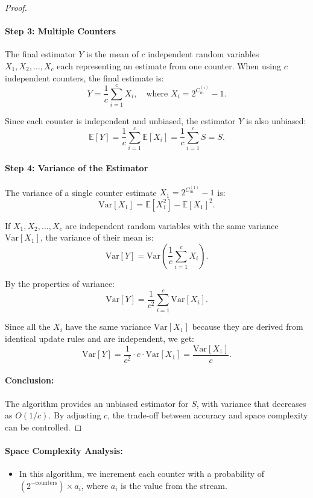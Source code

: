\documentclass[12pt]{article}
\newenvironment{problem}[2][Problem]{\begin{trivlist}
\item[\hskip \labelsep {\bfseries #1}\hskip \labelsep {\bfseries #2.}]}{\end{trivlist}}
\begin{document}
\begin{problem}{1}
\begin{proof}
        \paragraph{Step 3: Multiple Counters}
        The final estimator $Y$ is the mean of $c$ independent random variables $X_1, X_2, \dots, X_c$ each representing an estimate from one counter.
        When using \(c\) independent counters, the final estimate is:
        \[
            Y = \frac{1}{c} \sum_{i=1}^c X_i, \quad \text{where } X_i = 2^{C_m^{(i)}} - 1.
        \]

        Since each counter is independent and unbiased, the estimator \(Y\) is also unbiased:
        \[
            \mathbb{E}[Y] = \frac{1}{c} \sum_{i=1}^c \mathbb{E}[X_i] = \frac{1}{c} \sum_{i=1}^c S = S.
        \]
    
        \paragraph{Step 4: Variance of the Estimator}
        The variance of a single counter estimate \(X_1 = 2^{C_m^{(1)}} - 1\) is:
        \[
            \text{Var}[X_1] = \mathbb{E}[X_1^2] - \mathbb{E}[X_1]^2.
        \]

        If \(X_1, X_2, \dots, X_c\) are independent random variables with the same variance \(\text{Var}[X_1]\), the variance of their mean is:
        \[
        \text{Var}[Y] = \text{Var}\left(\frac{1}{c} \sum_{i=1}^c X_i\right).
        \]

        By the properties of variance:
        \[
        \text{Var}[Y] = \frac{1}{c^2} \sum_{i=1}^c \text{Var}[X_i].
        \]

        Since all the \(X_i\) have the same variance \(\text{Var}[X_1]\) because they are derived from identical update rules and are independent, we get:
        \[
        \text{Var}[Y] = \frac{1}{c^2} \cdot c \cdot \text{Var}[X_1] = \frac{\text{Var}[X_1]}{c}.
        \]
    
        \paragraph{Conclusion:}
        The algorithm provides an unbiased estimator for \(S\), with variance that decreases as \(O(1/c)\). By adjusting \(c\), the trade-off between accuracy and space complexity can be controlled.
    \end{proof}
    
    \paragraph{Space Complexity Analysis:}
    \begin{itemize}
        \item In this algorithm, we increment each counter with a probability of 
            \( (2^{-\text{counters}}) \times a_i \), where \( a_i \) is the value from the stream.
        

\end{itemize}
\end{problem}
\end{document}
